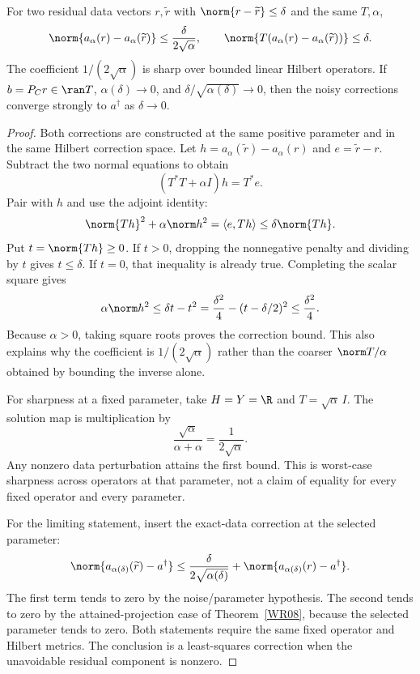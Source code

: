 \begin{theorem}\label{WR09}
For two residual data vectors $r,\widetilde r$ with $\norm{r-\widetilde r}\le\delta$ and the same $T,\alpha$,
\[
 \norm{a_\alpha(r)-a_\alpha(\widetilde r)}
 \le\frac{\delta}{2\sqrt\alpha},\qquad
 \norm{T(a_\alpha(r)-a_\alpha(\widetilde r))}\le\delta.
\]
The coefficient $1/(2\sqrt\alpha)$ is sharp over bounded linear Hilbert operators. If $b=P_Cr\in\ran T$, $\alpha(\delta)\to0$, and $\delta/\sqrt{\alpha(\delta)}\to0$, then the noisy corrections converge strongly to $a^\dagger$ as $\delta\to0$.
\end{theorem}
\begin{proof}
Both corrections are constructed at the same positive parameter and in the same Hilbert correction space. Let $h=a_\alpha(\widetilde r)-a_\alpha(r)$ and $e=\widetilde r-r$. Subtract the two normal equations to obtain
\[
 (T^*T+\alpha I)h=T^*e.
\]
Pair with $h$ and use the adjoint identity:
\[
 \norm{Th}^2+\alpha\norm h^2
 =\langle e,Th\rangle\le\delta\norm{Th}.
\]
Put $t=\norm{Th}\ge0$. If $t>0$, dropping the nonnegative penalty and dividing by $t$ gives $t\le\delta$. If $t=0$, that inequality is already true. Completing the scalar square gives
\[
 \alpha\norm h^2\le\delta t-t^2
 =\frac{\delta^2}{4}-(t-\delta/2)^2
 \le\frac{\delta^2}{4}.
\]
Because $\alpha>0$, taking square roots proves the correction bound. This also explains why the coefficient is $1/(2\sqrt\alpha)$ rather than the coarser $\norm T/\alpha$ obtained by bounding the inverse alone.

For sharpness at a fixed parameter, take $H=Y=\R$ and $T=\sqrt\alpha\,I$. The solution map is multiplication by
\[
 \frac{\sqrt\alpha}{\alpha+\alpha}=\frac1{2\sqrt\alpha}.
\]
Any nonzero data perturbation attains the first bound. This is worst-case sharpness across operators at that parameter, not a claim of equality for every fixed operator and every parameter.

For the limiting statement, insert the exact-data correction at the selected parameter:
\[
 \norm{a_{\alpha(\delta)}(\widetilde r)-a^\dagger}
 \le\frac{\delta}{2\sqrt{\alpha(\delta)}}
       +\norm{a_{\alpha(\delta)}(r)-a^\dagger}.
\]
The first term tends to zero by the noise/parameter hypothesis. The second tends to zero by the attained-projection case of Theorem~\ref{WR08}, because the selected parameter tends to zero. Both statements require the same fixed operator and Hilbert metrics. The conclusion is a least-squares correction when the unavoidable residual component is nonzero.
\end{proof}


